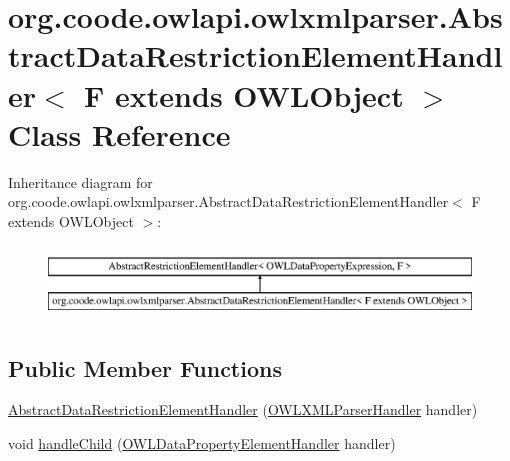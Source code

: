 \hypertarget{classorg_1_1coode_1_1owlapi_1_1owlxmlparser_1_1_abstract_data_restriction_element_handler_3_01_f_01extends_01_o_w_l_object_01_4}{\section{org.\-coode.\-owlapi.\-owlxmlparser.\-Abstract\-Data\-Restriction\-Element\-Handler$<$ F extends O\-W\-L\-Object $>$ Class Reference}
\label{classorg_1_1coode_1_1owlapi_1_1owlxmlparser_1_1_abstract_data_restriction_element_handler_3_01_f_01extends_01_o_w_l_object_01_4}
}
Inheritance diagram for org.\-coode.\-owlapi.\-owlxmlparser.\-Abstract\-Data\-Restriction\-Element\-Handler$<$ F extends O\-W\-L\-Object $>$\-:\begin{figure}[H]
\begin{center}
\leavevmode
\includegraphics[height=1.961471cm]{classorg_1_1coode_1_1owlapi_1_1owlxmlparser_1_1_abstract_data_restriction_element_handler_3_01_f_01extends_01_o_w_l_object_01_4}
\end{center}
\end{figure}
\subsection*{Public Member Functions}
\begin{DoxyCompactItemize}
\item 
\hyperlink{classorg_1_1coode_1_1owlapi_1_1owlxmlparser_1_1_abstract_data_restriction_element_handler_3_01_f_01extends_01_o_w_l_object_01_4_ad750361abfb2e90326847d9baef4fee4}{Abstract\-Data\-Restriction\-Element\-Handler} (\hyperlink{classorg_1_1coode_1_1owlapi_1_1owlxmlparser_1_1_o_w_l_x_m_l_parser_handler}{O\-W\-L\-X\-M\-L\-Parser\-Handler} handler)
\item 
void \hyperlink{classorg_1_1coode_1_1owlapi_1_1owlxmlparser_1_1_abstract_data_restriction_element_handler_3_01_f_01extends_01_o_w_l_object_01_4_ad6c93697dca654b8325fb17d5da8053a}{handle\-Child} (\hyperlink{classorg_1_1coode_1_1owlapi_1_1owlxmlparser_1_1_o_w_l_data_property_element_handler}{O\-W\-L\-Data\-Property\-Element\-Handler} handler)
\end{DoxyCompactItemize}


